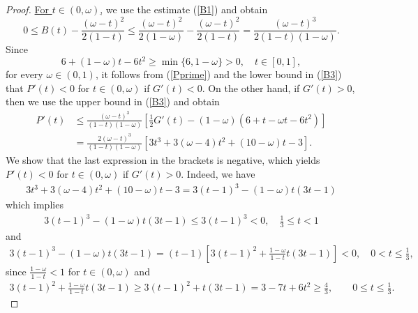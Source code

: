 \documentclass[10pt,a4paper]{amsart}
\begin{document}
\begin{proof}
\underline{For $t\in (0,\omega)$,} we use the estimate (\ref{B1})  and obtain 
		\begin{equation}\label{B3}
		0 \leq  B(t) - \frac{(\omega-t)^2}{2(1-t)} \leq \frac{(\omega -t)^2}{2(1-\omega)} - \frac{(\omega-t)^2}{2(1-t)} = \frac{(\omega-t)^3}{2(1-t)(1-\omega)}.  
		\end{equation}
Since 
$$
6 + (1-\omega) t - 6t^2 \geq \min\{ 6, 1-\omega\} > 0, \quad  t \in [0,1],
$$ 
for every $\omega \in (0,1)$, it follows from (\ref{Pprime}) and the lower bound in (\ref{B3}) that $P'(t) < 0$ for $t \in (0,\omega)$ if $G'(t) < 0$. 
On the other hand, if $G'(t) > 0$, then we use the upper bound in (\ref{B3}) and obtain 
\begin{align*}
P'(t) &\leq \frac{(\omega-t)^3}{(1-t)(1-\omega)} \left[ \frac{1}{2} G'(t) - (1-\omega)(6+t-\omega t - 6t^2)  \right] \\
&= \frac{2 (\omega-t)^3}{(1-t)(1-\omega)} \left[ 3 t^3 + 3 (\omega - 4) t^2 + (10-\omega) t - 3 \right].
\end{align*}
We show that the last expression in the brackets is negative, which yields 
$P'(t) < 0$ for $t \in (0,\omega)$ if $G'(t) > 0$. Indeed, we have 
\begin{align*}
3 t^3 + 3 (\omega - 4) t^2 + (10-\omega) t - 3 = 3(t-1)^3 - (1-\omega) t (3t - 1)
\end{align*}
which implies 
\begin{align*}
3(t-1)^3 - (1-\omega) t (3t - 1) \leq 3 (t-1)^3 < 0, \quad  \frac{1}{3} \leq t < 1
\end{align*}
and 
\begin{align*}
3(t-1)^3 - (1-\omega) t (3t - 1) = (t-1) \left[ 3 (t-1)^2 + \frac{1-\omega}{1-t} t (3t - 1) \right] < 0, \quad  0 < t \leq \frac{1}{3}, 
\end{align*}
since $\frac{1-\omega}{1-t} < 1$ for $t \in (0,\omega)$ and 
\begin{align*}
 3 (t-1)^2 + \frac{1-\omega}{1-t} t (3t - 1) \geq 
  3 (t-1)^2 + t (3t - 1) = 3 - 7t + 6 t^2 \geq \frac{4}{3}, \qquad 0 \leq t \leq \frac{1}{3}.
\end{align*}


\end{proof}
\end{document}
